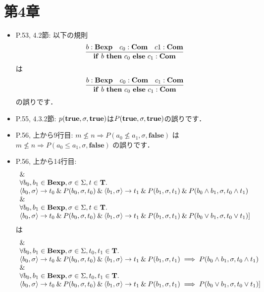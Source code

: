 \documentclass[12pt,titlepage,twoside,openright,dvipdfmx]{jsbook}
\theoremstyle{definition}
\begin{document}
\section*{第4章}

\begin{itemize}
  \item P.53, 4.2節: 以下の規則
  \[
    \infer
    {\mathbf{if}\ b\ \mathbf{then}\ c_0\ \mathbf{else}\ c_1:\mathbf{Com}}
    {b:\mathbf{Bexp} & c_0:\mathbf{Com} & c1:\mathbf{Com}}
  \]
  は
  \[
    \infer
    {\mathbf{if}\ b\ \mathbf{then}\ c_0\ \mathbf{else}\ c_1:\mathbf{Com}}
    {b:\mathbf{Bexp} & c_0:\mathbf{Com} & c_1:\mathbf{Com}}
  \]
  の誤りです．
\item P.55, 4.3.2節: $p(\mathbf{true}, \sigma,\mathbf{true})$は$P(\mathbf{true}, \sigma, \mathbf{true})$の誤りです．
\item P.56, 上から9行目:
  $m \not\le n \Rightarrow P(a_0 \not\le a_1,\sigma,\mathbf{false})$
  は
  $m \not\le n \Rightarrow P(a_0 \le a_1,\sigma,\mathbf{false})$
  の誤りです．
\item P.56, 上から14行目:
  \[
    \begin{array}{ll}
    \mathbin{\&}\\
    \forall{b_0,b_1\in\mathbf{Bexp},\sigma\in\Sigma,t\in\mathbf{T}}.\\
      \langle{b_0,\sigma}\rangle\rightarrow t_0 \mathbin{\&} P(b_0,\sigma,t_0) \mathbin{\&} \langle{b_1,\sigma}\rangle\rightarrow t_1 \mathbin{\&} P(b_1,\sigma,t_1) \mathbin{\&} P(b_0\wedge b_1,\sigma, t_0\wedge t_1)\\
      \mathbin{\&}\\
      \forall{b_0,b_1\in\mathbf{Bexp},\sigma\in\Sigma,t\in\mathbf{T}}.\\
      \langle{b_0,\sigma}\rangle\rightarrow t_0 \mathbin{\&} P(b_0,\sigma,t_0) \mathbin{\&} \langle{b_1,\sigma}\rangle\rightarrow t_1 \mathbin{\&} P(b_1,\sigma,t_1) \mathbin{\&} P(b_0\vee b_1,\sigma, t_0\vee t_1) \rbrack
    \end{array}
  \]
  は
  \[
    \begin{array}{ll}
    \mathbin{\&}\\
      \forall{b_0,b_1\in\mathbf{Bexp},\sigma\in\Sigma,t_0,t_1\in\mathbf{T}}.\\
      \langle{b_0,\sigma}\rangle\rightarrow t_0 \mathbin{\&} P(b_0,\sigma,t_0) \mathbin{\&} \langle{b_1,\sigma}\rangle\rightarrow t_1 \mathbin{\&} P(b_1,\sigma,t_1) \implies P(b_0\wedge b_1,\sigma, t_0\wedge t_1)\\
      \mathbin{\&}\\
      \forall{b_0,b_1\in\mathbf{Bexp},\sigma\in\Sigma,t_0,t_1\in\mathbf{T}}.\\
      \langle{b_0,\sigma}\rangle\rightarrow t_0 \mathbin{\&} P(b_0,\sigma,t_0) \mathbin{\&} \langle{b_1,\sigma}\rangle\rightarrow t_1 \mathbin{\&} P(b_1,\sigma,t_1) \implies P(b_0\vee b_1,\sigma, t_0\vee t_1) \rbrack

\end{array}\]
\end{itemize}
\end{document}
